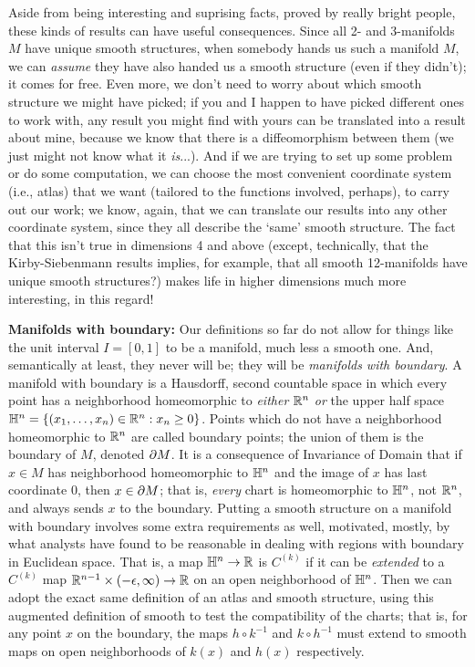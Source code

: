 \ssk

Aside from being interesting and suprising facts, proved by really bright people, these kinds 
of results can have useful consequences. Since all 2- and 3-manifolds $M$ have unique smooth 
structures, when somebody hands us such a manifold $M$, we can {\it assume} they have also 
handed us a smooth structure (even if they didn't); it comes for free. Even more, we don't
need to worry about which smooth structure we might have picked; if you and I happen to have
picked different ones to work with, any result you might find with yours can be translated
into a result about mine, because we know that there is a diffeomorphism between them (we just
might not know what it {\it is}...). And if we are trying to set up some problem or do some
computation, we can choose the most convenient coordinate system (i.e., atlas) that we want
(tailored to the functions involved, perhaps), to carry out our work; we know, again, that we
can translate our results into any other coordinate system, since they all describe the 
`same' smooth structure. The fact that this isn't true in dimensions 4 and above (except, 
technically, that the Kirby-Siebenmann results implies, for example, that all smooth 12-manifolds 
have unique smooth structures?) makes life in higher dimensions much more interesting, in 
this regard! 

\msk

{\bf Manifolds with boundary:} Our definitions so far do not allow for things like the unit
interval $I=[0,1]$ to be a manifold, much less a smooth one. And, semantically at least,
they never will be; they will be {\it manifolds with boundary}. A manifold with boundary is
a Hausdorff, second countable space in which every point has a neighborhood homeomorphic
to {\it either} ${\Bbb R}^n$ {\it or} the upper half space ${\Bbb H}^n = \{(x_1,\ldots ,x_n)\in{\Bbb R}^n : 
x_n\geq 0\}$. Points which do not have a neighborhood homeomorphic to ${\Bbb R}^n$ are called
boundary points; the union of them is the boundary of $M$, denoted $\partial M$. It is a 
consequence of Invariance of Domain that if $x\in M$ has neighborhood homeomorphic to 
${\Bbb H}^n$ and the image of $x$ has last coordinate $0$, then $x\in \partial M$; that is,
{\it every} chart is homeomorphic to ${\Bbb H}^n$, not ${\Bbb R}^n$, and always sends $x$ to the 
boundary. Putting a smooth structure on a manifold with boundary involves some extra
requirements as well, motivated, mostly, by what analysts have found to be reasonable
in dealing with regions with boundary in Euclidean space. That is, a map ${\Bbb H}^n\rightarrow {\Bbb R}$
is $C^{(k)}$ if it can be {\it extended} to a $C^{(k)}$ map 
${\Bbb R}^{n-1}\times (-\epsilon,\infty)\rightarrow {\Bbb R}$ on an open neighborhood of ${\Bbb H}^n$.
Then we can adopt the exact same definition of an atlas and smooth structure, using
this augmented definition of smooth to test the compatibility of the charts; that is, for
any point $x$ on the boundary, the maps $h\circ k^{-1}$ and $k\circ h^{-1}$ must extend to smooth 
maps on open neighborhoods of $k(x)$ and $h(x)$ respectively.

